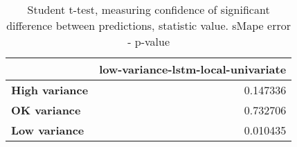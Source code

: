 \begin{table}[h]
\centering
\caption{Student t-test, measuring confidence of significant difference between predictions, statistic value. sMape error - p-value}
\label{table:ttest-p-values-variance-experiments-sMAPE}
\begin{tabular}{lr}
\toprule
{} &  low-variance-lstm-local-univariate \\
\midrule
\textbf{High variance} &                            0.147336 \\
\textbf{OK variance  } &                            0.732706 \\
\textbf{Low variance } &                            0.010435 \\
\bottomrule
\end{tabular}
\end{table}
